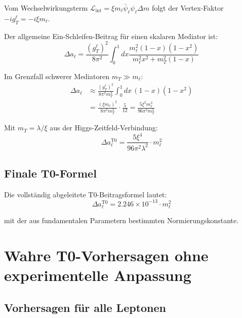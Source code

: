 \documentclass[12pt,a4paper]{article}
\begin{document}
	\begin{derivation}
		Vom Wechselwirkungsterm $\mathcal{L}_{\mathrm{int}} = \xi m_\ell \bar{\psi}_\ell \psi_\ell \Delta m$ folgt der Vertex-Faktor $-i g_T^\ell = -i \xi m_\ell$.
		
		Der allgemeine Ein-Schleifen-Beitrag für einen skalaren Mediator ist:
		\begin{equation}
			\Delta a_\ell = \frac{(g_T^\ell)^2}{8\pi^2} \int_0^1 dx \frac{m_\ell^2 (1-x)(1-x^2)}{m_\ell^2 x^2 + m_T^2 (1-x)}
		\end{equation}
		
		Im Grenzfall schwerer Mediatoren $m_T \gg m_\ell$:
		\begin{align}
			\Delta a_\ell &\approx \frac{(g_T^\ell)^2}{8\pi^2 m_T^2} \int_0^1 dx \, (1-x)(1-x^2) \\
			&= \frac{(\xi m_\ell)^2}{8\pi^2 m_T^2} \cdot \frac{5}{12} = \frac{5\xi^2 m_\ell^2}{96\pi^2 m_T^2}
		\end{align}
		
		Mit $m_T = \lambda/\xi$ aus der Higgs-Zeitfeld-Verbindung:
		\begin{equation}
			\Delta a_\ell^{\mathrm{T0}} = \frac{5\xi^4}{96\pi^2\lambda^2} \cdot m_\ell^2
			\label{eq:t0_fundamental_formula}
		\end{equation}
	\end{derivation}
	
	\subsection{Finale T0-Formel}
	
	\begin{keyresult}
		Die vollständig abgeleitete T0-Beitragsformel lautet:
		\begin{equation}
			\Delta a_\ell^{\mathrm{T0}} = 2.246 \times 10^{-13} \cdot m_\ell^2
			\label{eq:final_t0_formula}
		\end{equation}
		
		mit der aus fundamentalen Parametern bestimmten Normierungskonstante.
	\end{keyresult}
	
	\section{Wahre T0-Vorhersagen ohne experimentelle Anpassung}
	
	\subsection{Vorhersagen für alle Leptonen}
	
\end{document}
